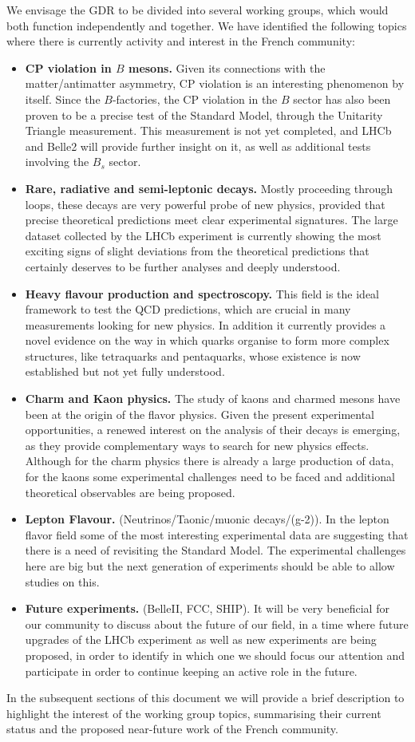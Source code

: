 We envisage the GDR to be divided into several working groups, which would both function independently and together. We have identified the following topics where there is currently activity and interest in the French community:
\begin{itemize}
\item {\bf CP violation in $B$ mesons.} Given its connections with the matter/antimatter asymmetry, CP violation is an interesting phenomenon by itself. Since the $B$-factories, the CP violation in the  $B$ sector has also been proven to be a precise test of the Standard Model, through the Unitarity Triangle measurement. This measurement is not yet completed, and LHCb and Belle2 will provide further insight on it, as well as additional tests involving the $B_s$ sector. 
\item {\bf Rare, radiative and semi-leptonic decays.} Mostly proceeding through loops, these decays are very powerful probe of new physics, provided that precise theoretical predictions meet clear experimental signatures. The large dataset collected by the LHCb experiment is currently showing the most exciting signs of slight deviations from the theoretical predictions that certainly deserves to be further analyses and deeply understood. 
\item {\bf Heavy flavour production and spectroscopy.} This field is the ideal framework to test the QCD predictions, which are crucial in many measurements looking for new physics. In addition it currently provides a novel evidence on the way in which quarks organise to form more complex structures, like tetraquarks and pentaquarks, whose existence is now established but not yet fully understood. 
\item {\bf Charm and Kaon physics.} The study of kaons and charmed mesons have been at the origin of the flavor physics. Given the present experimental opportunities, a renewed interest on the analysis of their decays is emerging, as they provide complementary ways to search for new physics effects. Although for the charm physics there is already a large production of data, for the kaons some experimental challenges need to be faced and additional theoretical observables are being proposed.  
\item {\bf Lepton Flavour. } (Neutrinos/Taonic/muonic decays/(g-2)). In the lepton flavor field some of the most interesting experimental data are suggesting that there is a need of revisiting the Standard Model. The experimental challenges here are big but the next generation of experiments should be able to allow studies on this. 
\item {\bf Future experiments.} (BelleII, FCC, SHIP). It will be very beneficial for our community to discuss about the future of our field, in a time where future upgrades of the LHCb experiment as well as new experiments are being proposed, in order to identify in which one we should focus our attention and participate in order to continue keeping an active role in the future. 
\end{itemize}
In the subsequent sections of this document we will provide a brief description to highlight  the interest of the working group topics,  summarising their  current status and the proposed near-future work of the French community.


